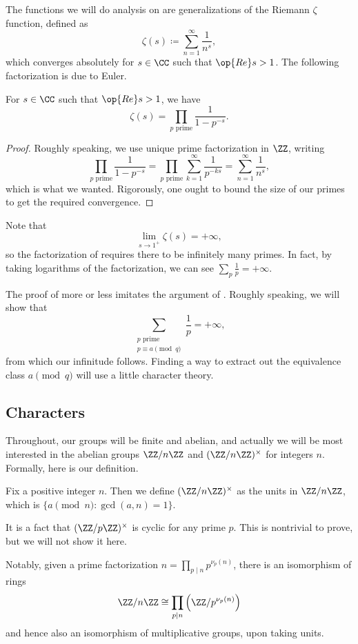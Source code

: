 \documentclass[../notes.tex]{subfiles}
\begin{document}
The functions we will do analysis on are generalizations of the Riemann $\zeta$ function, defined as
\[\zeta(s)\coloneqq\sum_{n=1}^\infty\frac1{n^s},\]
which converges absolutely for $s\in\CC$ such that $\op{Re}s>1$. The following factorization is due to Euler.
\begin{proposition} \label{prop:euler-factor}
	For $s\in\CC$ such that $\op{Re}s>1$, we have
	\[\zeta(s)=\prod_{p\text{ prime}}\frac1{1-p^{-s}}.\]
\end{proposition}
\begin{proof}
	Roughly speaking, we use unique prime factorization in $\ZZ$, writing
	\[\prod_{p\text{ prime}}\frac1{1-p^{-s}}=\prod_{p\text{ prime}}\sum_{k=1}^\infty\frac1{p^{-ks}}=\sum_{n=1}^\infty\frac1{n^s},\]
	which is what we wanted. Rigorously, one ought to bound the size of our primes to get the required convergence.
\end{proof}
\begin{remark} \label{rem:euler-inf-primes}
	Note that
	\[\lim_{s\to1^+}\zeta(s)=+\infty,\]
	so the factorization of  requires there to be infinitely many primes. In fact, by taking logarithms of the factorization, we can see $\sum_p\frac1p=+\infty$.
\end{remark}
The proof of  more or less imitates the argument of . Roughly speaking, we will show that
\[\sum_{\substack{p\text{ prime}\\p\equiv a\pmod q}}\frac1p=+\infty,\]
from which our infinitude follows. Finding a way to extract out the equivalence class $a\pmod q$ will use a little character theory.

\subsection{Characters}
Throughout, our groups will be finite and abelian, and actually we will be most interested in the abelian groups $\ZZ/n\ZZ$ and $(\ZZ/n\ZZ)^\times$ for integers $n$. Formally, here is our definition.
\begin{definition}
	Fix a positive integer $n$. Then we define $(\ZZ/n\ZZ)^\times$ as the units in $\ZZ/n\ZZ$, which is $\{a\pmod n:\gcd(a,n)=1\}$.
\end{definition}
\begin{remark}
	It is a fact that $(\ZZ/p\ZZ)^\times$ is cyclic for any prime $p$. This is nontrivial to prove, but we will not show it here.
\end{remark}
Notably, given a prime factorization $n=\prod_{p\mid n}p^{\nu_p(n)}$, there is an isomorphism of rings
\[\ZZ/n\ZZ\cong\prod_{p\mid n}\left(\ZZ/p^{\nu_p(n)}\right)\]
and hence also an isomorphism of multiplicative groups, upon taking units.
\end{document}

